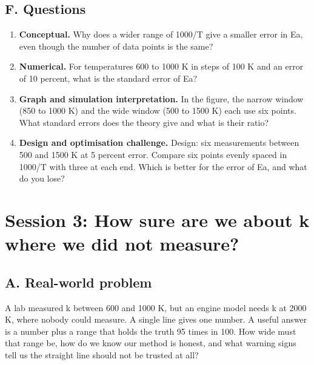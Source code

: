 \documentclass[11pt,a4paper]{article}
\begin{document}
\subsection*{F. Questions}
\begin{enumerate}[nosep]
\item \textbf{Conceptual.} Why does a wider range of 1000/T give a smaller error in Ea, even though the number of data points is the same?
\item \textbf{Numerical.} For temperatures 600 to 1000 K in steps of 100 K and an error of 10 percent, what is the standard error of Ea?
\item \textbf{Graph and simulation interpretation.} In the figure, the narrow window (850 to 1000 K) and the wide window (500 to 1500 K) each use six points. What standard errors does the theory give and what is their ratio?
\item \textbf{Design and optimisation challenge.} Design: six measurements between 500 and 1500 K at 5 percent error. Compare six points evenly spaced in 1000/T with three at each end. Which is better for the error of Ea, and what do you lose?
\end{enumerate}

\section{Session 3: How sure are we about k where we did not measure?}

\subsection*{A. Real-world problem}
A lab measured k between 600 and 1000 K, but an engine model needs k at 2000 K, where nobody could measure. A single line gives one number. A useful answer is a number plus a range that holds the truth 95 times in 100. How wide must that range be, how do we know our method is honest, and what warning signs tell us the straight line should not be trusted at all?
\end{document}
